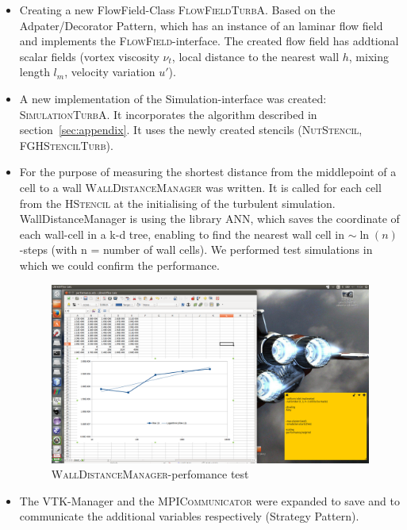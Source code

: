 \documentclass[11pt,a4paper]{article}
\begin{document}
\begin{itemize}
\item Creating a new FlowField-Class \textsc{FlowFieldTurbA}. Based on the Adpater/Decorator Pattern, which has an instance of an laminar flow field and implements the \textsc{FlowField}-interface. The created flow field has addtional scalar fields (vortex viscosity $\nu_t$, local distance to the nearest wall $h$, mixing length $l_m$, velocity variation $u'$).
\item A new implementation of the Simulation-interface was created: \textsc{SimulationTurbA}. It incorporates the algorithm described in section~\ref{sec:appendix}. It uses the newly created stencils (\textsc{NutStencil}, \textsc{FGHStencilTurb}).
\item For the purpose of measuring the shortest distance from the middlepoint of a cell to a wall \textsc{WallDistanceManager} was written. It is called for each cell from the \textsc{HStencil} at the initialising of the turbulent simulation. WallDistanceManager is using the library ANN, which saves the coordinate of each wall-cell in a k-d tree, enabling to find the nearest wall cell in $\sim\ln(n)$-steps (with n = number of wall cells). We performed test simulations in which we could confirm the performance.

\begin{figure}[h]
    \centering
    \includegraphics[width=1.0\textwidth]{ann}
    \caption{\textsc{WallDistanceManager}-perfomance test}
    \label{fig:vels}
\end{figure}

\item The VTK-Manager and the \textsc{MPICommunicator} were expanded to save and to communicate the additional variables respectively (Strategy Pattern).
\end{itemize}
\end{document}
